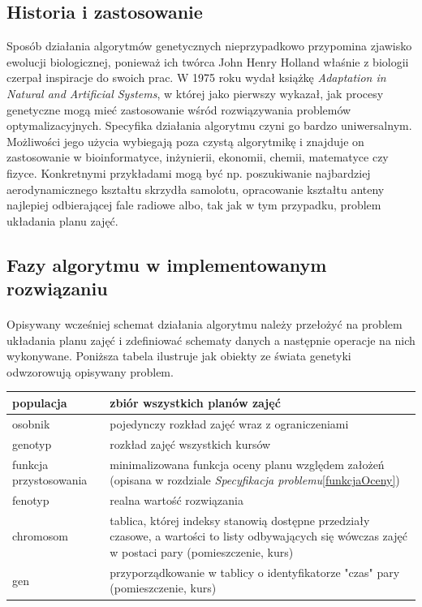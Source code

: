 \subsection{Historia i zastosowanie}
Sposób działania algorytmów genetycznych nieprzypadkowo przypomina zjawisko ewolucji biologicznej, ponieważ ich twórca John Henry Holland właśnie z biologii czerpał inspiracje do swoich prac\cite{Mitchell}. W 1975 roku wydał książkę \emph{Adaptation in Natural and Artificial Systems}, w której jako pierwszy wykazał, jak procesy genetyczne mogą mieć zastosowanie wśród rozwiązywania problemów optymalizacyjnych. Specyfika działania algorytmu czyni go bardzo uniwersalnym. Możliwości jego użycia wybiegają poza czystą algorytmikę i znajduje on zastosowanie w bioinformatyce, inżynierii, ekonomii, chemii, matematyce czy fizyce. Konkretnymi przykładami mogą być np. poszukiwanie najbardziej aerodynamicznego kształtu skrzydła samolotu, opracowanie kształtu anteny najlepiej odbierającej fale radiowe albo, tak jak w tym przypadku, problem układania planu zajęć.
\subsection{Fazy algorytmu w implementowanym rozwiązaniu}
\paragraph{}Opisywany wcześniej schemat działania algorytmu należy przełożyć na problem układania planu zajęć i zdefiniować schematy danych a następnie operacje na nich wykonywane. Poniższa tabela ilustruje jak obiekty ze świata genetyki odwzorowują opisywany problem.
\begin{center}
\begin{tabular}{| l | p{10cm} |}
\hline
populacja & zbiór wszystkich planów zajęć \\ \hline
osobnik & pojedynczy rozkład zajęć wraz z ograniczeniami \\ \hline
genotyp & rozkład zajęć wszystkich kursów \\ \hline
funkcja przystosowania & minimalizowana funkcja oceny planu względem założeń (opisana w rozdziale \emph{Specyfikacja problemu}\ref{funkcjaOceny}) \\ \hline
fenotyp & realna wartość rozwiązania \\ \hline
chromosom & tablica, której indeksy stanowią dostępne przedziały czasowe, a wartości to listy odbywających się wówczas zajęć w postaci pary (pomieszczenie, kurs) \\ \hline
gen & przyporządkowanie w tablicy o identyfikatorze "czas" pary  (pomieszczenie, kurs) \\ \hline
\end{tabular}
\end{center}
